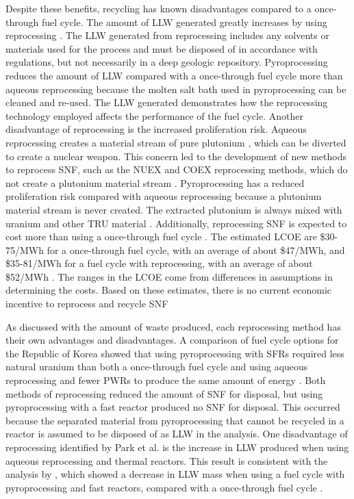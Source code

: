 Despite these benefits, recycling has known disadvantages compared to 
a once-through fuel cycle.
The amount of \gls{LLW} generated greatly increases by using 
reprocessing \cite{widder_benefits_2010}. The \gls{LLW} generated 
from reprocessing includes any solvents or materials used for the process 
and must be disposed of in accordance with regulations, but not 
necessarily in a deep geologic repository.
Pyroprocessing reduces the amount of \gls{LLW} compared with 
a once-through fuel cycle more than aqueous reprocessing because
the molten salt bath used in pyroprocessing can be cleaned 
and re-used. The \gls{LLW} generated demonstrates how the reprocessing 
technology employed affects the performance of the fuel cycle. 
Another disadvantage of reprocessing is the increased proliferation 
risk. Aqueous reprocessing creates a material stream of 
pure plutonium \cite{widder_benefits_2010}, which can be diverted to 
create a nuclear weapon. This concern led to the development of new 
methods to reprocess \gls{SNF}, such as the NUEX and COEX reprocessing 
methods, which do not create a plutonium material stream 
\cite{widder_benefits_2010}. 
Pyroprocessing has a reduced proliferation risk compared with 
aqueous reprocessing
because a plutonium material stream is never created. The extracted 
plutonium is always mixed with uranium and other \gls{TRU} material 
\cite{noauthor_status_2021}.
Additionally, reprocessing \gls{SNF} is expected to cost more than 
using a once-through fuel cycle \cite{rodriguez-penalonga_review_2017,widder_benefits_2010}. 
The estimated 
\gls{LCOE} are \$30-75/MWh for a once-through fuel cycle, with an 
average of about \$47/MWh, and \$35-81/MWh for a fuel 
cycle with reprocessing, with an average of about \$52/MWh 
\cite{widder_benefits_2010}. The ranges in the \gls{LCOE} come from 
differences in assumptions in determining the costs. Based on these 
estimates, there is no current economic incentive to reprocess and recycle 
\gls{SNF}

As discussed with the amount of waste produced, each reprocessing method 
has their own advantages and disadvantages. 
A comparison of fuel cycle options for the Republic of Korea 
showed that using pyroprocessing with \glspl{SFR} required less natural 
uranium than both a once-through fuel cycle and using aqueous reprocessing 
and fewer \glspl{PWR} to produce the same amount of energy 
\cite{park_comparative_2011}. Both methods of reprocessing  
reduced the amount of \gls{SNF} for disposal,
but using pyroprocessing with a fast reactor produced no \gls{SNF} for 
disposal. This occurred because the separated material from 
pyroprocessing that cannot be recycled in a reactor is assumed to be 
disposed of as \gls{LLW} in the analysis. One disadvantage of reprocessing 
identified by Park et al. is the increase in \gls{LLW} produced 
when using aqueous reprocessing and 
thermal reactors. This result is consistent with the analysis 
by \cite{widder_benefits_2010}, which showed a decrease in \gls{LLW} 
mass when using a fuel cycle with pyroprocessing and fast reactors, 
compared with a once-through fuel cycle \cite{park_comparative_2011}. 

